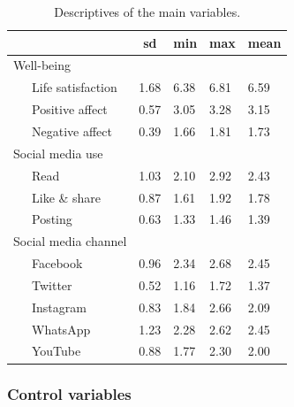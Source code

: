 \documentclass[
  english,
  man,mask,floatsintext]{apa6}
\begin{document}
\begin{table}[tbp]

\begin{center}
\begin{threeparttable}

\caption{\label{tab:descriptives}Descriptives of the main variables.}

\begin{tabular}{lllll}
\toprule
 & \multicolumn{1}{c}{sd} & \multicolumn{1}{c}{min} & \multicolumn{1}{c}{max} & \multicolumn{1}{c}{mean}\\
\midrule
Well-being &  &  &  & \\
\ \ \ Life satisfaction & 1.68 & 6.38 & 6.81 & 6.59\\
\ \ \ Positive affect & 0.57 & 3.05 & 3.28 & 3.15\\
\ \ \ Negative affect & 0.39 & 1.66 & 1.81 & 1.73\\
Social media use &  &  &  & \\
\ \ \ Read & 1.03 & 2.10 & 2.92 & 2.43\\
\ \ \ Like \& share & 0.87 & 1.61 & 1.92 & 1.78\\
\ \ \ Posting & 0.63 & 1.33 & 1.46 & 1.39\\
Social media channel &  &  &  & \\
\ \ \ Facebook & 0.96 & 2.34 & 2.68 & 2.45\\
\ \ \ Twitter & 0.52 & 1.16 & 1.72 & 1.37\\
\ \ \ Instagram & 0.83 & 1.84 & 2.66 & 2.09\\
\ \ \ WhatsApp & 1.23 & 2.28 & 2.62 & 2.45\\
\ \ \ YouTube & 0.88 & 1.77 & 2.30 & 2.00\\
\bottomrule
\end{tabular}

\end{threeparttable}
\end{center}

\end{table}

\hypertarget{control-variables}{%
\subsubsection{Control variables}\label{control-variables}}
\end{document}
